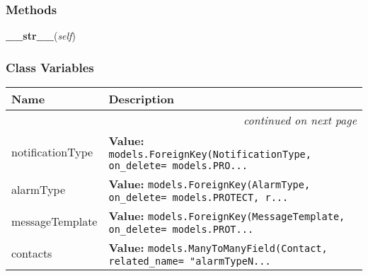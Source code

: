   \subsubsection{Methods}

    \label{GroundSegment:models:Notification:AlarmTypeNotificationType:AlarmTypeNotificationType:__str__}

    \vspace{0.5ex}

\hspace{.8\funcindent}\begin{boxedminipage}{\funcwidth}

    \raggedright \textbf{\_\_str\_\_}(\textit{self})

\setlength{\parskip}{2ex}
\setlength{\parskip}{1ex}
    \end{boxedminipage}



  \subsubsection{Class Variables}

    \vspace{-1cm}
\hspace{\varindent}\begin{longtable}{|p{\varnamewidth}|p{\vardescrwidth}|l}
\cline{1-2}
\cline{1-2} \centering \textbf{Name} & \centering \textbf{Description}& \\
\cline{1-2}
\endhead\cline{1-2}\multicolumn{3}{r}{\small\textit{continued on next page}}\\\endfoot\cline{1-2}
\endlastfoot\raggedright n\-o\-t\-i\-f\-i\-c\-a\-t\-i\-o\-n\-T\-y\-p\-e\- & \raggedright \textbf{Value:} 
{\tt models.ForeignKey(NotificationType, on\_delete= models.PRO\texttt{...}}&\\
\cline{1-2}
\raggedright a\-l\-a\-r\-m\-T\-y\-p\-e\- & \raggedright \textbf{Value:} 
{\tt models.ForeignKey(AlarmType, on\_delete= models.PROTECT, r\texttt{...}}&\\
\cline{1-2}
\raggedright m\-e\-s\-s\-a\-g\-e\-T\-e\-m\-p\-l\-a\-t\-e\- & \raggedright \textbf{Value:} 
{\tt models.ForeignKey(MessageTemplate, on\_delete= models.PROT\texttt{...}}&\\
\cline{1-2}
\raggedright c\-o\-n\-t\-a\-c\-t\-s\- & \raggedright \textbf{Value:} 
{\tt models.ManyToManyField(Contact, related\_name= "alarmTypeN\texttt{...}}&\\
\cline{1-2}
\end{longtable}

